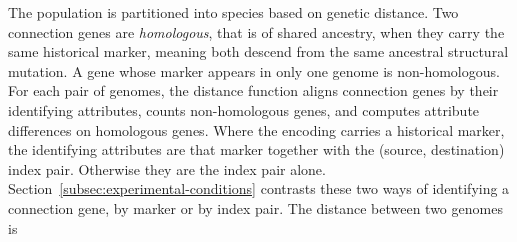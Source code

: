 \documentclass[12pt]{article}
\begin{document}
The population is partitioned into species based on genetic distance.
Two connection genes are \emph{homologous}, that is of shared ancestry, when they carry the same historical marker, meaning both descend from the same ancestral structural mutation. A gene whose marker appears in only one genome is non-homologous.
For each pair of genomes, the distance function aligns connection genes by their identifying attributes, counts non-homologous genes, and computes attribute differences on homologous genes.
Where the encoding carries a historical marker, the identifying attributes are that marker together with the (source, destination) index pair. Otherwise they are the index pair alone. Section~\ref{subsec:experimental-conditions} contrasts these two ways of identifying a connection gene, by marker or by index pair.
The distance between two genomes is
\end{document}
